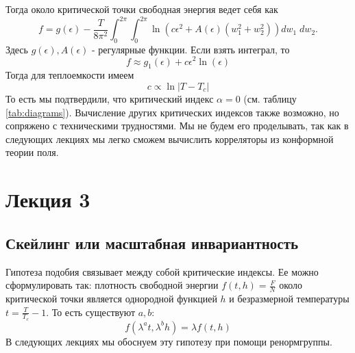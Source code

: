\documentclass[a4paper,12pt]{article}
\theoremstyle{definition}
\theoremstyle{definition}
\theoremstyle{definition}
\begin{document}
Тогда около критической точки свободная энергия ведет себя как
\begin{equation}
  \label{eq:141}
  f=g(\epsilon)-\frac{T}{8\pi^2}\int_{0}^{2\pi}\int_0^{2\pi}\ln \left( c\epsilon^2 +A(\epsilon)(w_1^2+w_2^2)\right)dw_1\;dw_2.
\end{equation}
Здесь $g(\epsilon), A(\epsilon)$ - регулярные функции. Если взять интеграл, то
\begin{equation}
  \label{eq:142}
  f\approx g_1 (\epsilon)+c\epsilon^2 \ln(\epsilon)
\end{equation}
Тогда для теплоемкости имеем
\begin{equation}
  \label{eq:143}
  c\propto \ln|T-T_c|
\end{equation}
То есть мы подтвердили, что критический индекс $\alpha=0$ (см. таблицу \ref{tab:diagrams}). Вычисление других критических индексов также возможно, но сопряжено с техническими трудностями. Мы не будем его проделывать, так как в следующих лекциях мы легко сможем вычислить корреляторы из конформной теории поля.

\section{Лекция 3}
\label{sec:lecture-3}


\subsection{Скейлинг или масштабная инвариантность}
\label{sec:scaling}

Гипотеза подобия связывает между собой критические индексы. Ее можно сформулировать так: плотность свободной энергии $f(t,h)=\frac{F}{N}$ около критической точки является однородной функцией $h$ и безразмерной температуры $t=\frac{T}{T_c}-1$. То есть существуют $a,b$:
\begin{equation}
  \label{eq:33}
  f(\lambda^a t,\lambda^b h)=\lambda f(t,h)
\end{equation}
В следующих лекциях мы обоснуем эту гипотезу при помощи ренормгруппы.
\end{document}
